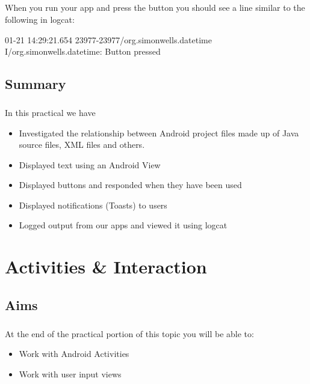 \documentclass[12pt, a4paper, twoside]{book}
\begin{document}
\paragraph{} When you run your app and press the button you should see a line similar to the following in logcat:

\begin{framed}
{\scriptsize{
01-21 14:29:21.654 23977-23977/org.simonwells.datetime I/org.simonwells.datetime: Button pressed
}}
\end{framed}

\section{Summary}
\paragraph{} In this practical we have 

\begin{itemize}
\item Investigated the relationship between Android project files made up of Java source files, XML files and others.
\item Displayed text using an Android View
\item Displayed buttons and responded when they have been used
\item Displayed notifications (Toasts) to users
\item Logged output from our apps and viewed it using logcat
\end{itemize}





\chapter{Activities \& Interaction}

\section{Aims}
\paragraph{} At the end of the practical portion of this topic you will be able to:

\begin{itemize}
\item Work with Android Activities
\item Work with user input views
\end{itemize}
\end{document}
